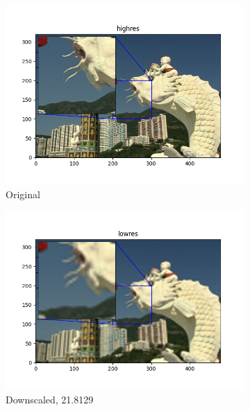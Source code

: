 \documentclass[12pt]{article}
\begin{document}
\begin{figure}[h!]
  \begin{subfigure}[b]{0.32\linewidth}
    \includegraphics[width=\linewidth]{./9-highres.png}
    \caption{Original}
  \end{subfigure}
  \hfill
  \begin{subfigure}[b]{0.32\linewidth}
    \includegraphics[width=\linewidth]{./9-lowres.png}
    \caption{Downscaled, 21.8129}
  \end{subfigure}
  \hfill
  \begin{subfigure}[b]{0.32\linewidth}

\end{subfigure}
\end{figure}
\end{document}
